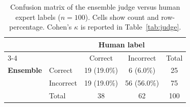 \begin{table}[H]
\centering
\caption{Confusion matrix of the ensemble judge versus human expert labels ($n = 100$). Cells show count and row-percentage. Cohen's $\kappa$ is reported in Table~\ref{tab:judge}.}
\label{tab:confusion}
\begin{tabular}{l l c c c}
\toprule
 & & \multicolumn{2}{c}{\textbf{Human label}} & \\
\cmidrule(lr){3-4}
 & & Correct & Incorrect & Total \\
\midrule
\textbf{Ensemble} & Correct & 19 (19.0\%) & 6 (6.0\%) & 25 \\
 & Incorrect & 19 (19.0\%) & 56 (56.0\%) & 75 \\
\midrule
& Total & 38 & 62 & 100 \\
\bottomrule
\end{tabular}
\end{table}